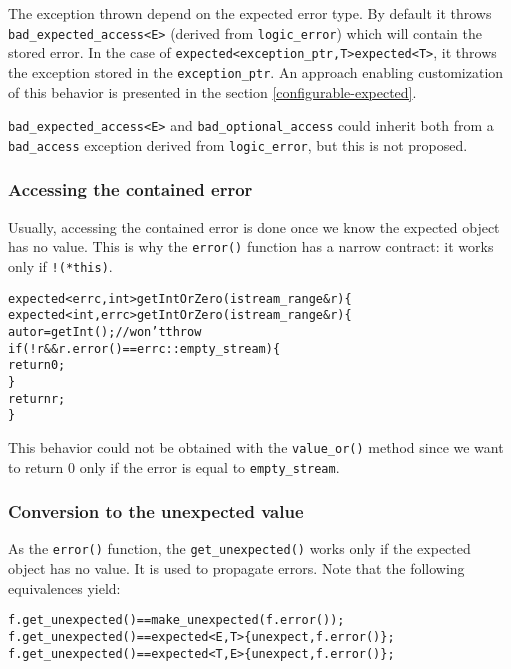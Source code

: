 \documentclass[a4paper,10pt]{article}
\newcommand{\cpp}[1]{\lstinline{#1}}
\newcommand{\suppress}[1]{\colorbox{suppress_color}{#1}}
\newcommand{\update}[1]{\colorbox{update_color}{#1}}
\begin{document}
The exception thrown depend on the expected error type. By default it throws \cpp{bad_expected_access<E>} (derived from \cpp{logic_error}) which will contain the stored error. In the case of \suppress{\cpp{expected<exception_ptr,T>}}\update{\cpp{expected<T>}}, it throws the exception stored in the \cpp{exception_ptr}. An approach enabling customization of this behavior is presented in the section \ref{configurable-expected}.

\cpp{bad_expected_access<E>} and \cpp{bad_optional_access} could inherit both from a \cpp{bad_access} exception derived from \cpp{logic_error}, but this is not proposed.

\subsubsection{Accessing the contained error}

Usually, accessing the contained error is done once we know the expected object has no value. This is why the \cpp{error()} function has a narrow contract: it works only if \cpp{!(*this)}.

\begin{alltt}
\suppress{expected<errc,int> getIntOrZero(istream_range& r)\{}
\update{expected<int, errc> getIntOrZero(istream_range& r)\{}
  auto r = getInt();  // won't throw
  if (!r && r.error() == errc::empty_stream)\{
    return 0;
  \}
  return r;
\}
\end{alltt}

\noindent
This behavior could not be obtained with the \cpp{value_or()} method since we want to return 0 only if the error is equal to \cpp{empty_stream}.

\subsubsection{Conversion to the unexpected value}

As the \cpp{error()} function, the \cpp{get_unexpected()} works only if the expected object has no value. It is used to propagate errors. Note that the following equivalences yield:

\begin{alltt}
f.get_unexpected() == make_unexpected(f.error());
\suppress{f.get_unexpected() == expected<E, T>\{unexpect, f.error()\};}
\update{f.get_unexpected() == expected<T, E>\{unexpect, f.error()\};}
\end{alltt}
\end{document}
